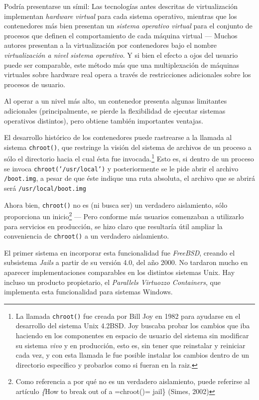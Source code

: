 \documentclass[11pt,fleqn]{book} %
\begin{document}
Podría presentarse un símil: Las tecnologías antes descritas de
virtualización implementan \emph{hardware virtual} para cada sistema
operativo, mientras que los contenedores más bien presentan un
\emph{sistema operativo virtual} para el conjunto de procesos que definen
el comportamiento de cada máquina virtual — Muchos autores presentan a
la virtualización por contenedores bajo el nombre \emph{virtualización a nivel sistema operativo}. Y si bien el efecto a ojos del usuario
puede ser comparable, este método más que una multiplexación de
máquinas virtuales sobre hardware real opera a través de
restricciones adicionales sobre los procesos de usuario.

Al operar a un nivel más alto, un contenedor presenta algunas
limitantes adicionales (principalmente, se pierde la flexibilidad de
ejecutar sistemas operativos distintos), pero obtiene también
importantes ventajas.

El desarrollo histórico de los contenedores puede rastrearse a la
llamada al sistema \texttt{chroot()}, que restringe la visión del sistema de
archivos de un proceso a sólo el directorio hacia el cual ésta fue
invocada.\footnote{La llamada \texttt{chroot()} fue creada por Bill Joy en 1982
para ayudarse en el desarrollo del sistema Unix 4.2BSD. Joy buscaba
probar los cambios que iba haciendo en los componentes en espacio de
usuario del sistema sin modificar su sistema \emph{vivo} y en producción,
esto es, sin tener que reinstalar y reiniciar cada vez, y con esta
llamada le fue posible instalar los cambios dentro de un directorio
específico y probarlos como si fueran en la raiz. } Esto es, si dentro
de un proceso se invoca \texttt{chroot('/usr/local')} y posteriormente se le
pide abrir el archivo \texttt{/boot.img}, a pesar de que éste indique una
ruta absoluta, el archivo que se abrirá será \texttt{/usr/local/boot.img}

Ahora bien, \texttt{chroot()} no es (ni busca ser) un verdadero aislamiento,
sólo proporciona un inicio\footnote{Como referencia a por qué no es un
verdadero aislamiento, puede referirse al artículo \emph\{How to break out
of a =chroot()= jail\} (Simes, 2002) } — Pero conforme más usuarios
comenzaban a utilizarlo para servicios en producción, se hizo claro
que resultaría útil ampliar la conveniencia de \texttt{chroot()} a un
verdadero aislamiento.

El primer sistema en incorporar esta funcionalidad fue \emph{FreeBSD},
creando el subsistema \emph{Jails} a partir de su versión 4.0, del
año 2000. No tardaron mucho en aparecer implementaciones comparables
en los distintos sistemas Unix. Hay incluso un producto propietario,
el \emph{Parallels Virtuozzo Containers}, que implementa esta
funcionalidad para sistemas Windows.
\end{document}
